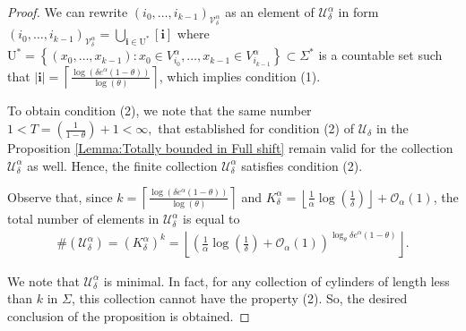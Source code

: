 \documentclass[11pt, reqno]{amsart}
\theoremstyle{plain}%
\theoremstyle{definition}
\theoremstyle{definition}
\def\U{\ensuremath{\mathcal U}}
\def\i{\textbf{i}}
\numberwithin{equation}{section}
\begin{document}
\begin{proof}
We can rewrite $(i_0,\ldots,i_{k-1})_{\mathcal{V}_\delta^{\alpha}}$ as an element of $\U_{\delta}^{\alpha}$ in form $(i_0,\ldots,i_{k-1})_{\mathcal{V}_\delta^{\alpha}}=\bigcup_{\i\in\mathrm{U^*}}[\textbf{i}]$ where $\mathrm{U^*}=\left\{ (x_0,\ldots,x_{k-1}):  x_0\in V_{i_0}^{\alpha},\ldots,x_{k-1}\in V_{i_{k-1}}^{\alpha}    \right\}\subset \Sigma^*$ is a countable set such that $|\textbf{i}|= \left\lceil\frac{\log(\delta e^\alpha(1-\theta))}{\log(\theta)}\right\rceil$, which implies condition (1). 
    


To obtain condition (2), we note that the same number $ 1<T=\left( \frac{1}{1-\theta} \right)+1<\infty,$ that established for condition (2) of $\U_\delta$ in the Proposition \ref{Lemma:Totally bounded in Full shift} remain valid for the collection $\U_{\delta}^{\alpha}$ as well.
Hence, the finite collection $\U_{\delta}^{\alpha}$ satisfies condition (2).

Observe that, since $k=\left\lceil \frac{\log(\delta e^{\alpha}(1-\theta))}{\log(\theta)}\right\rceil$ and $K_\delta^{\alpha}= \left\lfloor \frac{1}{\alpha} \log \left(\frac{1}{\delta}\right)\right\rfloor+\mathcal{O}_\alpha(1)$, the total number of elements in $\U_{\delta}^{\alpha}$ is equal to 
\begin{align*}
    \#(\U_{\delta}^{\alpha})=(K_\delta^{\alpha})^k= \left\lfloor\left( \frac{1}{\alpha} \log \left(\frac{1}{\delta}\right)+\mathcal{O}_\alpha(1)\right) ^ { \log_\theta{\delta e^\alpha(1-\theta)}}\right\rfloor.
\end{align*}



We note that $\U_{\delta}^{\alpha}$ is minimal. In fact, for any collection of cylinders of length less than $k$ in $\Sigma$, this collection cannot have the property (2). So, the desired conclusion of the proposition is obtained.
\end{proof}


\end{document}
